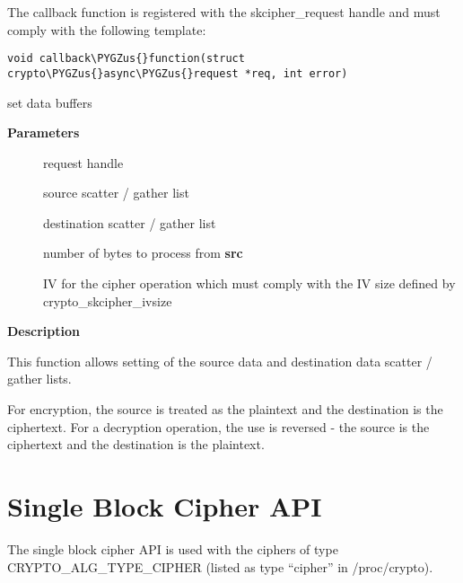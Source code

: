 \documentclass[a4paper,8pt,english]{sphinxmanual}
\def\PYGZus{\char`\_}
\begin{document}
The callback function is registered with the skcipher\_request handle and
must comply with the following template:

\begin{Verbatim}[commandchars=\\\{\}]
void callback\PYGZus{}function(struct crypto\PYGZus{}async\PYGZus{}request *req, int error)
\end{Verbatim}

\begin{fulllineitems}
\label{crypto/api-skcipher:c.skcipher_request_set_crypt}
set data buffers

\end{fulllineitems}


\textbf{Parameters}
\begin{description}
\item[{}] \leavevmode
request handle

\item[{}] \leavevmode
source scatter / gather list

\item[{}] \leavevmode
destination scatter / gather list

\item[{}] \leavevmode
number of bytes to process from \textbf{src}

\item[{}] \leavevmode
IV for the cipher operation which must comply with the IV size defined
by crypto\_skcipher\_ivsize

\end{description}

\textbf{Description}

This function allows setting of the source data and destination data
scatter / gather lists.

For encryption, the source is treated as the plaintext and the
destination is the ciphertext. For a decryption operation, the use is
reversed - the source is the ciphertext and the destination is the plaintext.


\section{Single Block Cipher API}
\label{crypto/api-skcipher:single-block-cipher-api}
The single block cipher API is used with the ciphers of type
CRYPTO\_ALG\_TYPE\_CIPHER (listed as type ``cipher'' in /proc/crypto).
\end{document}
